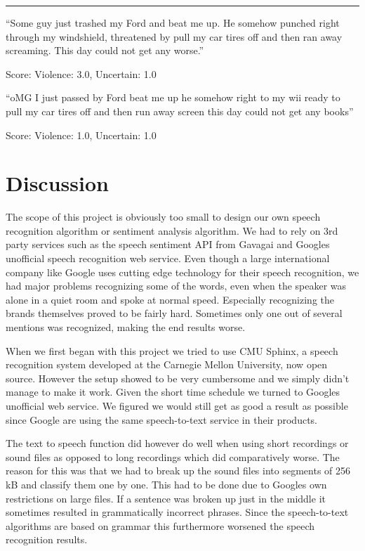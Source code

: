 \documentclass[a4paper,12pt,twoside]{ltxdoc}
\newcommand*\sepline{%
  \begin{center}
    \rule[1ex]{.5\textwidth}{.5pt}
  \end{center}}
\begin{document}
\sepline 

\begin{center}
``Some guy just trashed my Ford and beat me up. He somehow punched right through my windshield, threatened by pull my car tires off and then ran away screaming. This day could not get any worse.''
\end{center}
\hfill Score: Violence: 3.0, Uncertain: 1.0

\begin{center}
``oMG I just passed by Ford beat me up he somehow right to my wii ready to pull my car tires off and then run away screen this day could not get any books''
\end{center}
\hfill Score: Violence: 1.0, Uncertain: 1.0

\section{Discussion}
The scope of this project is obviously too small to design our own speech recognition algorithm or sentiment analysis algorithm. We had to rely on 3rd party services such as the speech sentiment API from Gavagai and Googles unofficial speech recognition web service. Even though a large international company like Google uses cutting edge technology for their speech recognition, we had major problems recognizing some of the words, even when the speaker was alone in a quiet room and spoke at normal speed. Especially recognizing the brands themselves proved to be fairly hard. Sometimes only one out of several mentions was recognized, making the end results worse. 

When we first began with this project we tried to use CMU Sphinx, a speech recognition system developed at the Carnegie Mellon University, now open source. However the setup showed to be very cumbersome and we simply didn't manage to make it work. Given the short time schedule we turned to Googles unofficial web service. We figured we would still get as good a result as possible since Google are using the same speech-to-text service in their products. 

The text to speech function did however do well when using short recordings or sound files as opposed to long recordings which did comparatively worse. The reason for this was that we had to break up the sound files into segments of 256 kB and classify them one by one. This had to be done due to Googles own restrictions on large files. If a sentence was broken up just in the middle it sometimes resulted in grammatically incorrect phrases. Since the speech-to-text algorithms are based on grammar this furthermore worsened the speech recognition results.
\end{document}
